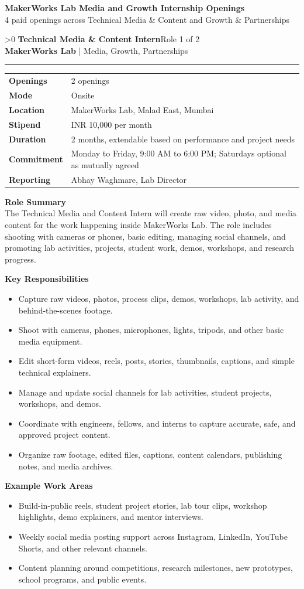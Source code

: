\documentclass[10pt,a4paper]{article}
\newcommand{\CommonLocation}{MakerWorks Lab, Malad East, Mumbai}
\newcommand{\CommonStipend}{INR 10,000 per month}
\newcommand{\CommonDuration}{2 months, extendable based on performance and project needs}
\newcommand{\CommonCommitment}{Monday to Friday, 9:00 AM to 6:00 PM; Saturdays optional as mutually agreed}
\newcommand{\CommonReporting}{Abhay Waghmare, Lab Director}
\newcounter{rolepage}
\newcommand{\RolePage}[3]{%
  \ifnum\value{rolepage}>0\clearpage\fi
  \stepcounter{rolepage}
  \thispagestyle{plain}
  {\Large\textbf{#1}}\hfill{\small #2}\\
  {\small\textbf{MakerWorks Lab} | Media, Growth, Partnerships}\\[4pt]
  \hrule
  \vspace{6pt}
  #3
}
\newcommand{\DetailsTable}[3]{%
\begin{tabularx}{\linewidth}{>{\bfseries}p{30mm}X}
Openings & #3 \\
Mode & #1 \\
Location & #2 \\
Stipend & \CommonStipend \\
Duration & \CommonDuration \\
Commitment & \CommonCommitment \\
Reporting & \CommonReporting \\
\end{tabularx}
}
\newcommand{\RoleSection}[1]{\vspace{5pt}\par\noindent\textbf{#1}\par\vspace{2pt}}
\begin{document}
\small

\begin{center}
{\Large\textbf{MakerWorks Lab Media and Growth Internship Openings}}\\
{\small 4 paid openings across Technical Media \& Content and Growth \& Partnerships}
\end{center}

\RolePage{Technical Media \& Content Intern}{Role 1 of 2}{
\DetailsTable{Onsite}{\CommonLocation}{2 openings}

\textbf{Role Summary}\\
The Technical Media and Content Intern will create raw video, photo, and media content for the work happening inside MakerWorks Lab. The role includes shooting with cameras or phones, basic editing, managing social channels, and promoting lab activities, projects, student work, demos, workshops, and research progress.

\RoleSection{Key Responsibilities}
\begin{itemize}
  \item Capture raw videos, photos, process clips, demos, workshops, lab activity, and behind-the-scenes footage.
  \item Shoot with cameras, phones, microphones, lights, tripods, and other basic media equipment.
  \item Edit short-form videos, reels, posts, stories, thumbnails, captions, and simple technical explainers.
  \item Manage and update social channels for lab activities, student projects, workshops, and demos.
  \item Coordinate with engineers, fellows, and interns to capture accurate, safe, and approved project content.
  \item Organize raw footage, edited files, captions, content calendars, publishing notes, and media archives.
\end{itemize}

\RoleSection{Example Work Areas}
\begin{itemize}
  \item Build-in-public reels, student project stories, lab tour clips, workshop highlights, demo explainers, and mentor interviews.
  \item Weekly social media posting support across Instagram, LinkedIn, YouTube Shorts, and other relevant channels.
  \item Content planning around competitions, research milestones, new prototypes, school programs, and public events.
\end{itemize}

}
\end{document}
